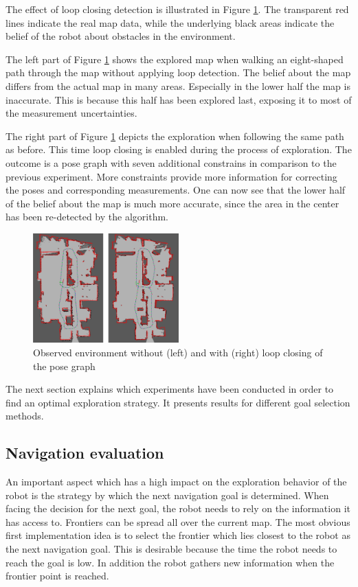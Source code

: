 \documentclass{ba-kecs}
\begin{document}
The effect of loop closing detection is illustrated in Figure \ref{fig:loop_closing_comparison}. The transparent red lines indicate the real map data, while the underlying black areas indicate the belief of the robot about obstacles in the environment.

The left part of Figure \ref{fig:loop_closing_comparison} shows the explored map when walking an eight-shaped path through the map without applying loop detection. The belief about the map differs from the actual map in many areas. Especially in the lower half the map is inaccurate. This is because this half has been explored last, exposing it to most of the measurement uncertainties.

The right part of Figure \ref{fig:loop_closing_comparison} depicts the exploration when following the same path as before. This time loop closing is enabled during the process of exploration. The outcome is a pose graph with seven additional constrains in comparison to the previous experiment. More constraints provide more information for correcting the poses and corresponding measurements. One can now see that the lower half of the belief about the map is much more accurate, since the area in the center has been re-detected by the algorithm.

\begin{figure}[htbp]
	\centering
		\includegraphics[width=0.50\textwidth]{figures/Loop_closing_compared.jpg}
	\caption{Observed environment without (left) and with (right) loop closing of the pose graph}
	\label{fig:loop_closing_comparison}
\end{figure}
The next section explains which experiments have been conducted in order to find an optimal exploration strategy. It presents results for different goal selection methods.

\subsection{Navigation evaluation}
\label{sec:navEval}
An important aspect which has a high impact on the exploration behavior of the robot is the strategy by which the next navigation goal is determined. When facing the decision for the next goal, the robot needs to rely on the information it has access to. Frontiers can be spread all over the current map. The most obvious first implementation idea is to select the frontier which lies closest to the robot as the next navigation goal. This is desirable because the time the robot needs to reach the goal is low. In addition the robot gathers new information when the frontier point is reached.
\end{document}
